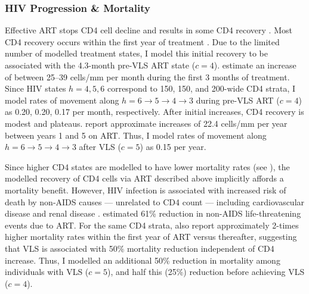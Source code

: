 \subsubsection{HIV Progression \& Mortality}\label{model.par.art.hiv}
\def\hunprog{$h = 6 \rightarrow 5 \rightarrow 4 \rightarrow 3$\xspace}
Effective ART stops CD4 cell decline and results in some CD4 recovery \cite{Battegay2006,Lawn2006}.
Most CD4 recovery occurs within the first year of treatment \cite{Battegay2006}.
Due to the limited number of modelled treatment states,
I model this initial recovery to be associated with the 4.3-month pre-VLS ART state ($c=4$).
\citet{Lawn2006,Gabillard2013} estimate an increase of between 25--39 cells/mm per month
during the first 3 months of treatment.
Since HIV states $h=4,5,6$ correspond to 150, 150, and 200-wide CD4 strata,
I model rates of movement along \hunprog during pre-VLS ART ($c=4$) as
0.20, 0.20, 0.17 per month, respectively.
After initial increases, CD4 recovery is modest and plateaus.
\citet{Battegay2006} report approximate increases of
22.4 cells/mm per year between years 1 and 5 on ART.
Thus, I model rates of movement along \hunprog after VLS ($c=5$) as 0.15 per year.
\par
Since higher CD4 states are modelled to have lower mortality rates (see ),
the modelled recovery of CD4 cells via ART described above implicitly affords a mortality benefit.
However, HIV infection is associated with increased risk of death by non-AIDS causes
--- \ie unrelated to CD4 count ---
including cardiovascular disease and renal disease \cite{Phillips2008}.
\citet{Lundgren2015} estimated 61\% reduction in non-AIDS life-threatening events due to ART.
For the same CD4 strata, \citet{Gabillard2013} also report approximately 2-times higher
mortality rates within the first year of ART versus thereafter,
suggesting that VLS is associated with 50\% mortality reduction independent of CD4 increase.
Thus, I modelled an additional 50\% reduction in mortality among individuals with VLS ($c=5$),
and half this (25\%) reduction before achieving VLS ($c=4$).
